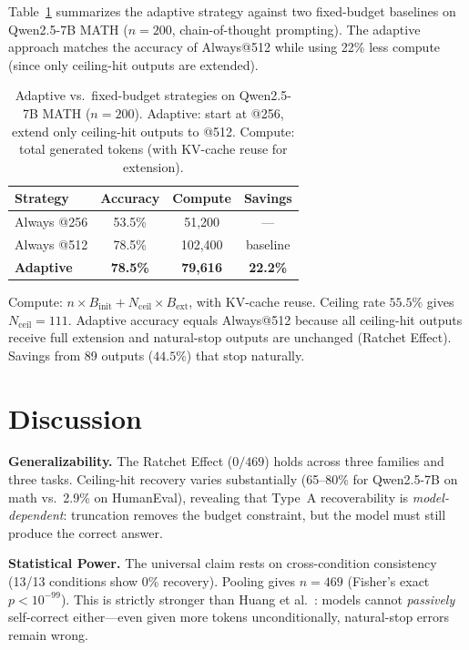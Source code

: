 \documentclass{article}
\begin{document}
Table~\ref{tab:adaptive} summarizes the adaptive strategy against two fixed-budget baselines on Qwen2.5-7B MATH ($n=200$, chain-of-thought prompting). The adaptive approach matches the accuracy of Always@512 while using 22\% less compute (since only ceiling-hit outputs are extended).

\begin{table}[h]
\centering
\caption{Adaptive vs.\ fixed-budget strategies on Qwen2.5-7B MATH ($n=200$). Adaptive: start at @256, extend only ceiling-hit outputs to @512. Compute: total generated tokens (with KV-cache reuse for extension).}
\label{tab:adaptive}
\begin{tabular}{lccc}
\toprule
\textbf{Strategy} & \textbf{Accuracy} & \textbf{Compute} & \textbf{Savings} \\
\midrule
Always @256 & 53.5\% & 51,200 & --- \\
Always @512 & 78.5\% & 102,400 & baseline \\
\textbf{Adaptive} & \textbf{78.5\%} & \textbf{79,616} & \textbf{22.2\%} \\
\bottomrule
\end{tabular}
\vspace{1mm}

\raggedright\small Compute: $n \times B_{\text{init}} + N_{\text{ceil}} \times B_{\text{ext}}$, with KV-cache reuse. Ceiling rate $55.5\%$ gives $N_{\text{ceil}} = 111$. Adaptive accuracy equals Always@512 because all ceiling-hit outputs receive full extension and natural-stop outputs are unchanged (Ratchet Effect). Savings from 89 outputs ($44.5\%$) that stop naturally.
\end{table}

\section{Discussion}

\textbf{Generalizability.}
The Ratchet Effect ($0/469$) holds across three families and three tasks. Ceiling-hit recovery varies substantially (65--80\% for Qwen2.5-7B on math vs.\ 2.9\% on HumanEval), revealing that Type~A recoverability is \emph{model-dependent}: truncation removes the budget constraint, but the model must still produce the correct answer.

\textbf{Statistical Power.}
The universal claim rests on cross-condition consistency (13/13 conditions show 0\% recovery). Pooling gives $n=469$ (Fisher's exact $p < 10^{-99}$). This is strictly stronger than Huang et al.~\cite{huang2023selfcorrect}: models cannot \emph{passively} self-correct either---even given more tokens unconditionally, natural-stop errors remain wrong.
\end{document}
